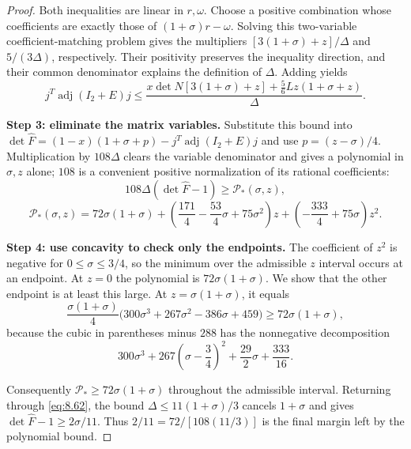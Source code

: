 \begin{proof}
Both inequalities are linear in $r,\omega$. Choose a positive combination
whose coefficients are exactly those of $(1+\sigma)r-\omega$.
Solving this two-variable coefficient-matching problem gives the multipliers
$[3(1+\sigma)+z]/\Delta$ and $5/(3\Delta)$, respectively.
Their positivity preserves the inequality direction, and their common
denominator explains the definition of $\Delta$. Adding yields
\begin{equation}\label{eq:8.61}
j^T\operatorname{adj}(I_2+E)j
\le\frac{x\det N[3(1+\sigma)+z]+\frac56Lz(1+\sigma+z)}\Delta.
\end{equation}

\textbf{Step 3: eliminate the matrix variables.} Substitute this bound into
$\det\widehat F=(1-x)(1+\sigma+p)-j^T\operatorname{adj}(I_2+E)j$
and use $p=(z-\sigma)/4$. Multiplication by $108\Delta$ clears the variable
denominator and gives a polynomial in $\sigma,z$ alone; $108$ is a convenient
positive normalization of its rational coefficients:
\begin{equation}\label{eq:8.62}
108\Delta(\det\widehat F-1)\ge\mathcal P_*(\sigma,z),
\end{equation}
\begin{equation}\label{eq:8.63}
\mathcal P_*(\sigma,z)=72\sigma(1+\sigma)
+\left(\frac{171}{4}-\frac{53}{4}\sigma+75\sigma^2\right)z
+\left(-\frac{333}{4}+75\sigma\right)z^2.
\end{equation}

\textbf{Step 4: use concavity to check only the endpoints.} The coefficient of
$z^2$ is negative for $0\le\sigma\le3/4$, so the minimum over the admissible
$z$ interval occurs at an endpoint. At $z=0$ the polynomial is
$72\sigma(1+\sigma)$. We show that the other endpoint is at least this large.
At $z=\sigma(1+\sigma)$, it equals
\begin{equation}\label{eq:8.64}
\frac{\sigma(1+\sigma)}4
\bigl(300\sigma^3+267\sigma^2-386\sigma+459\bigr)
\ge72\sigma(1+\sigma),
\end{equation}
because the cubic in parentheses minus $288$ has the nonnegative decomposition
\begin{equation}\label{eq:8.65}
300\sigma^3+267\left(\sigma-\frac34\right)^2
+\frac{29}{2}\sigma+\frac{333}{16}.
\end{equation}

Consequently $\mathcal P_*\ge72\sigma(1+\sigma)$ throughout the admissible
interval. Returning through \eqref{eq:8.62}, the bound
$\Delta\le11(1+\sigma)/3$ cancels $1+\sigma$ and gives
$\det\widehat F-1\ge2\sigma/11$.
Thus $2/11=72/[108(11/3)]$ is the final margin left by the polynomial bound. 
\end{proof}

